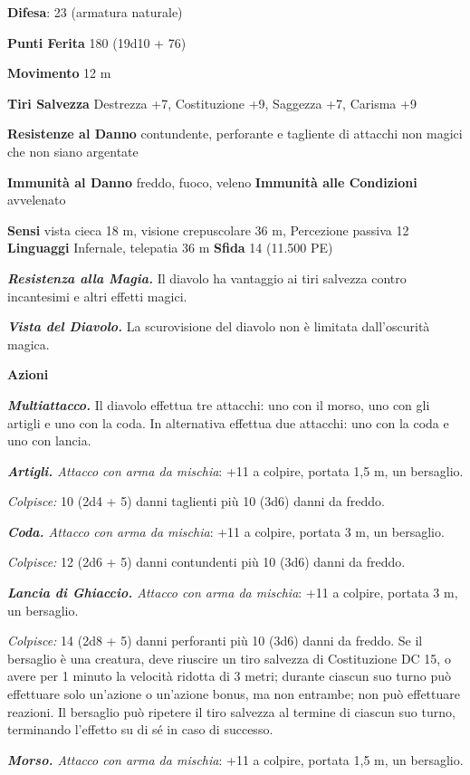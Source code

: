 \begin{multicols}{2}
\textbf{Difesa}: 23 (armatura naturale)

\textbf{Punti Ferita} 180 (19d10 + 76)

\textbf{Movimento} 12 m

\textbf{Tiri Salvezza} Destrezza +7, Costituzione +9, Saggezza +7,
Carisma +9

\textbf{Resistenze al Danno} contundente, perforante e tagliente di
attacchi non magici che non siano argentate

\textbf{Immunità al Danno} freddo, fuoco, veleno \textbf{Immunità alle
Condizioni} avvelenato

\textbf{Sensi} vista cieca 18 m, visione crepuscolare 36 m, Percezione passiva
12 \textbf{Linguaggi} Infernale, telepatia 36 m \textbf{Sfida} 14
(11.500 PE)

\emph{\textbf{Resistenza alla Magia.}} Il diavolo ha vantaggio ai tiri
salvezza contro incantesimi e altri effetti magici.

\emph{\textbf{Vista del Diavolo.}} La scurovisione del diavolo non è
limitata dall'oscurità magica.

\textbf{Azioni}

\emph{\textbf{Multiattacco.}} Il diavolo effettua tre attacchi: uno con
il morso, uno con gli artigli e uno con la coda. In alternativa effettua
due attacchi: uno con la coda e uno con lancia.

\emph{\textbf{Artigli.} Attacco con arma da mischia}: +11 a colpire,
portata 1,5 m, un bersaglio.

\emph{Colpisce:} 10 (2d4 + 5) danni taglienti più 10 (3d6) danni da
freddo.

\emph{\textbf{Coda.} Attacco con arma da mischia}: +11 a colpire,
portata 3 m, un bersaglio.

\emph{Colpisce:} 12 (2d6 + 5) danni contundenti più 10 (3d6) danni da
freddo.

\emph{\textbf{Lancia di Ghiaccio.} Attacco con arma da mischia}: +11 a
colpire, portata 3 m, un bersaglio.

\emph{Colpisce:} 14 (2d8 + 5) danni perforanti più 10 (3d6) danni da
freddo. Se il bersaglio è una creatura, deve riuscire un tiro salvezza
di Costituzione DC 15, o avere per 1 minuto la velocità ridotta di 3
metri; durante ciascun suo turno può effettuare solo un'azione o
un'azione bonus, ma non entrambe; non può effettuare reazioni. Il
bersaglio può ripetere il tiro salvezza al termine di ciascun suo turno,
terminando l'effetto su di sé in caso di successo.

\emph{\textbf{Morso.} Attacco con arma da mischia}: +11 a colpire,
portata 1,5 m, un bersaglio.


\end{multicols}
